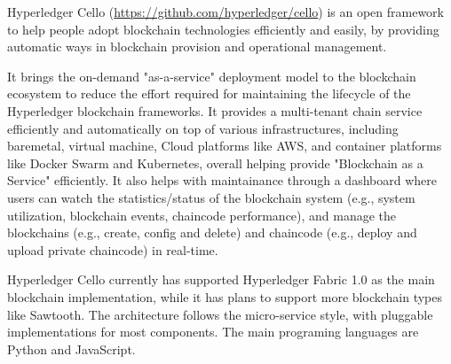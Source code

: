 Hyperledger Cello (\url{https://github.com/hyperledger/cello}) is an open framework to help people adopt blockchain technologies efficiently and easily, by providing automatic ways in blockchain provision and operational management. 

It brings the on-demand "as-a-service" deployment model to the blockchain ecosystem to reduce the effort required for maintaining the lifecycle of the Hyperledger blockchain frameworks. It provides a multi-tenant chain service efficiently and automatically on top of various infrastructures, including baremetal, virtual machine, Cloud platforms like AWS, and container platforms like Docker Swarm and Kubernetes, overall helping provide "Blockchain as a Service" efficiently. It also helps with maintainance through a dashboard where users can watch the statistics/status of the blockchain system (e.g., system utilization, blockchain events, chaincode performance), and manage the blockchains (e.g., create, config and delete) and chaincode (e.g., deploy and upload private chaincode) in real-time.

Hyperledger Cello currently has supported Hyperledger Fabric 1.0 as the main blockchain implementation, while it has plans to support more blockchain types like Sawtooth. The architecture follows the micro-service style, with pluggable implementations for most components. The main programing languages are Python and JavaScript.